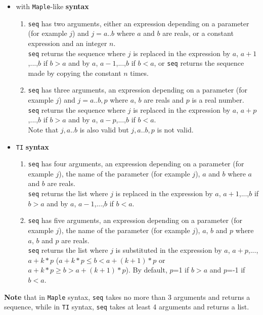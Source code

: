 \documentclass[a4paper,11pt]{book}
\begin{document}
\begin{itemize}
\item with {\tt Maple}-like {\bf syntax}  
\begin{enumerate}
\item {\tt seq} has two arguments, 
either an expression depending on a parameter 
(for example $j$) and  $j=a..b$  where $a$ and  $b$ are  reals, 
or a constant expression and an integer $n$.\\ 
{\tt seq} returns the sequence where $j$ is replaced in the 
expression by $a$, $a+1$,...,$b$ if $b>a$ and by $a$, $a-1$,...,$b$ if $b<a$,
or {\tt seq} returns the sequence made by copying the constant $n$ times.
\item {\tt seq} has three arguments, an expression depending on a parameter 
(for example $j$) and $j=a..b,p$ where $a$, $b$ are reals and $p$ is a 
real number.\\
{\tt seq} returns the sequence where $j$ is replaced in the 
expression by $a$, $a+p$,...,$b$ if $b>a$ and by $a$, $a-p$,...,$b$ 
if $b<a$.\\ 
Note that $j,a..b$ is also valid but $j,a..b,p$ is not valid. 
\end{enumerate}
\item {\tt TI} {\bf syntax}
\begin{enumerate}
\item {\tt seq} has four arguments, an expression depending on a parameter (for 
example $j$), the name of the parameter (for example $j$), $a$ and  $b$ where
$a$ and  $b$ are reals.\\
{\tt seq} returns the list  where $j$ is replaced in the 
expression by $a$, $a+1$,...,$b$ if $b>a$ and by $a$, $a-1$,...,$b$ if $b<a$.
\item {\tt seq} has five arguments, an expression depending on a parameter (for 
example $j$), the name of the parameter (for example $j$), $a$, $b$ and  $p$ 
where $a$, $b$ and  $p$ are reals.\\
{\tt seq} returns the list  where 
$j$ is substituted in the 
expression by $a$, $a+p$,...,$a+k*p$ ($a+k*p \leq b <a+(k+1)*p$ or 
$a+k*p \geq b> a+(k+1)*p$). 
By default, $p$=1 if $b>a$ and  $p$=-1  if $b<a$. 
\end{enumerate}
\end{itemize}
{\bf Note} that
in {\tt Maple} syntax, {\tt seq} takes no more than 3 arguments and
returns a sequence,
while in {\tt TI} syntax, {\tt seq} takes at least 4 arguments 
and returns a list.\\
\end{document}
